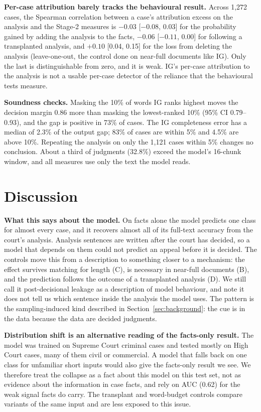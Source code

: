 \documentclass[conference]{IEEEtran}
\begin{document}
\textbf{Per-case attribution barely tracks the behavioural result.} Across 1,272 cases, the Spearman correlation between a case's attribution excess on the analysis and the Stage-2 measures is $-0.03$ [$-0.08$, 0.03] for the probability gained by adding the analysis to the facts, $-0.06$ [$-0.11$, 0.00] for following a transplanted analysis, and $+0.10$ [0.04, 0.15] for the loss from deleting the analysis (leave-one-out, the control done on near-full documents like IG). Only the last is distinguishable from zero, and it is weak. IG's per-case attribution to the analysis is not a usable per-case detector of the reliance that the behavioural tests measure.

\textbf{Soundness checks.} Masking the 10\% of words IG ranks highest moves the decision margin 0.86 more than masking the lowest-ranked 10\% (95\% CI 0.79--0.93), and the gap is positive in 73\% of cases. The IG completeness error has a median of 2.3\% of the output gap; 83\% of cases are within 5\% and 4.5\% are above 10\%. Repeating the analysis on only the 1,121 cases within 5\% changes no conclusion. About a third of judgments (32.8\%) exceed the model's 16-chunk window, and all measures use only the text the model reads.

\section{Discussion}
\label{sec:discussion}
\textbf{What this says about the model.} On facts alone the model predicts one class for almost every case, and it recovers almost all of its full-text accuracy from the court's analysis. Analysis sentences are written after the court has decided, so a model that depends on them could not predict an appeal before it is decided. The controls move this from a description to something closer to a mechanism: the effect survives matching for length (C), is necessary in near-full documents (B), and the prediction follows the outcome of a transplanted analysis (D). We still call it post-decisional leakage as a description of model behaviour, and note it does not tell us which sentence inside the analysis the model uses. The pattern is the sampling-induced kind described in Section~\ref{sec:background}: the cue is in the data because the data are decided judgments.

\textbf{Distribution shift is an alternative reading of the facts-only result.} The model was trained on Supreme Court criminal cases and tested mostly on High Court cases, many of them civil or commercial. A model that falls back on one class for unfamiliar short inputs would also give the facts-only result we see. We therefore treat the collapse as a fact about this model on this test set, not as evidence about the information in case facts, and rely on AUC (0.62) for the weak signal facts do carry. The transplant and word-budget controls compare variants of the same input and are less exposed to this issue.
\end{document}
